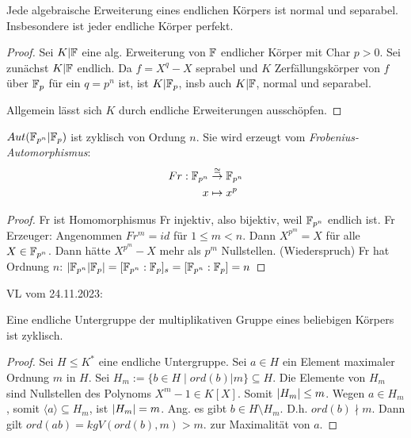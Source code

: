 \documentclass[../main.tex]{subfiles}
\begin{document}
\begin{corollary}
    Jede algebraische Erweiterung eines endlichen Körpers ist normal und separabel. Insbesondere ist jeder endliche Körper perfekt.
\end{corollary}
\begin{proof}
    Sei $K|\mathbb{F}$ eine alg. Erweiterung von $\mathbb{F}$ endlicher Körper mit Char $p>0$. Sei zunächst $K|\mathbb{F}$ endlich.
     Da $f=X^q-X$ seprabel und $K$ Zerfällungskörper von $f$ über $\mathbb{F}_p$ für ein $q=p^n$ ist, ist $K|\mathbb{F}_p$, insb auch $K|\mathbb{F}$, normal und separabel.

     Allgemein lässt sich $K$ durch endliche Erweiterungen ausschöpfen.
\end{proof}
\begin{theorem}
    $Aut(\mathbb{F}_{p^n}| \mathbb{F}_p)$ ist zyklisch von Ordung $n$. Sie wird erzeugt vom \emph{Frobenius-Automorphismus}:
    \begin{align*}
        Fr: \mathbb{F}_{p^n} &\overset{\cong}{\rightarrow}\mathbb{F}_{p^n}\\
        x&\mapsto x^p
    \end{align*}
\end{theorem}
\begin{proof}
    Fr ist Homomorphismus
    Fr injektiv, also bijektiv, weil $\mathbb{F}_{p^n}$ endlich ist.
    Fr Erzeuger: Angenommen $Fr^m = id$ für $1\leq m<n$. Dann $X^{p^m} = X$ für alle $X\in \mathbb{F}_{p^n}$. Dann hätte $X^{p^m}-X$ mehr als $p^m$ Nullstellen. (Wiederspruch)
    Fr hat Ordnung $n$: $\left\vert \mathbb{F}_{p^n} | \mathbb{F}_p \right\vert = [\mathbb{F}_{p^n} :\mathbb{F}_p]_s = [\mathbb{F}_{p^n}:\mathbb{F}_p] = n$
\end{proof}
\begin{flushright}
VL vom 24.11.2023:
\end{flushright}
\begin{theorem} \label{theo:2.55}
    Eine endliche Untergruppe der multiplikativen Gruppe eines beliebigen Körpers ist zyklisch.
\end{theorem}
\begin{proof}
    Sei $H\leq K^*$ eine endliche Untergruppe.
    Sei $a\in H$ ein Element maximaler Ordnung $m$ in $H$.
    Sei $H_m := \{b\in H\mid ord(b)|m\} \subseteq H$.
    Die Elemente von $H_m$ sind Nullstellen des Polynoms $X^m-1\in K[X]$.
    Somit $\left\vert H_m \right\vert\leq m$. Wegen $a\in H_m$, somit $\langle a\rangle\subseteq H_m$, ist $\left\vert H_m \right\vert=m$.
    Ang. es gibt $b\in H\setminus H_m$. D.h. $ord(b)\nmid m$.
    Dann gilt $ord(ab)= kgV(ord(b),m) >m$.
    \Lightning zur Maximalität von $a$.
\end{proof}
\end{document}
